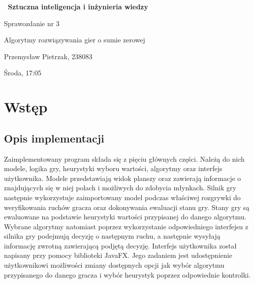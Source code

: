 \documentclass[a4paper,10pt]{article}
\begin{document}
    \begin{titlepage}
     \vspace*{\fill}
    
     \vspace*{-4cm}
     \Huge\bfseries\
     {Sztuczna inteligencja i inżynieria wiedzy}
    
     \LARGE
     \centering
     \vspace{2cm}
     {Sprawozdanie nr 3}
    
     \Large
     \centering
     {Algorytmy rozwiązywania gier o sumie zerowej}
     
     \vspace*{0.5cm}
     
     \centering
     \large 
     \vspace{0.5cm}
     Przemysław Pietrzak, 238083
     
     Środa, 17:05
     
     \vspace*{\fill}
     \restoregeometry
    \end{titlepage}
    
    \tableofcontents
    
    \section{Wstęp}
    \justify
    \subsection{Opis implementacji}
    Zaimplementowany program składa się z pięciu głównych części. Należą do nich modele, logika gry, heurystyki wyboru wartości, algorytmy oraz interfejs użytkownika. Modele przedstawiają widok planszy oraz zawierają informacje o znajdujących się w niej polach i możliwych do zdobycia młynkach. Silnik gry następnie wykorzystuje zaimportowany model podczas właściwej rozgrywki do weryfikowania ruchów gracza oraz dokonywania ewaluacji stanu gry. Stany gry są ewaluowane na podstawie heurystyki wartości przypisanej do danego algorytmu. Wybrane algorytmy natomiast poprzez wykorzystanie odpowiedniego interfejsu z silnika gry podejmują decyzję o następnym ruchu, a następnie wysyłają informację zwrotną zawierającą podjętą decyzję. Interfejs użytkownika został napisany przy pomocy biblioteki JavaFX. Jego zadaniem jest udostępnienie użytkownikowi możliwości zmiany dostępnych opcji jak wybór algorytmu przypisanego do danego gracza i wybór heurystyk poprzez odpowiednie kontrolki.
    
\end{document}
